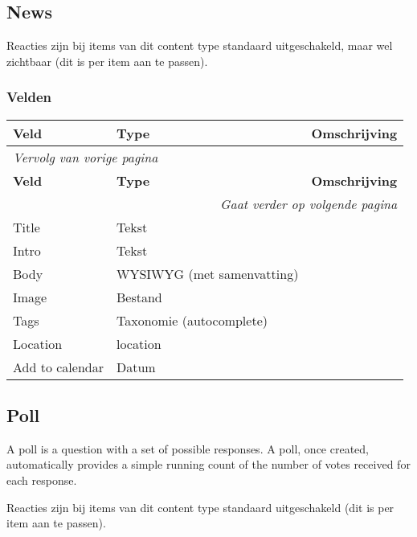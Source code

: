 \subsection{News}
\label{sec:content-news}
Reacties zijn bij items van dit content type standaard uitgeschakeld, maar wel zichtbaar (dit is per item aan te passen).

\subsubsection{Velden}
  \begin{longtable}{| p{3.75cm}|p{3.75cm}|p{7.50cm}|}
  \hline
  \rowcolor{tableheader}
  \textbf{Veld} & \textbf{Type} & \textbf{Omschrijving}  \tabularnewline
  \hline
\endfirsthead
\multicolumn{3}{l}{\textit{Vervolg van vorige pagina}} \\
\hline
\rowcolor{tableheader}
  \textbf{Veld} & \textbf{Type} & \textbf{Omschrijving}  \tabularnewline
  \hline
\hline
\endhead
\multicolumn{3}{r}{\textit{Gaat verder op volgende pagina}} \\
\endfoot
\hline
\endlastfoot
  \raggedright{Title} & \raggedright{Tekst} & \raggedright{}  \tabularnewline
  \hline
  \raggedright{Intro} & \raggedright{Tekst} & \raggedright{}  \tabularnewline
  \hline
  \raggedright{Body} & \raggedright{WYSIWYG (met samenvatting)} & \raggedright{}  \tabularnewline
  \hline
  \raggedright{Image} & \raggedright{Bestand} & \raggedright{}  \tabularnewline
  \hline
  \raggedright{Tags} & \raggedright{Taxonomie (autocomplete)} & \raggedright{}  \tabularnewline
  \hline
  \raggedright{Location} & \raggedright{location} & \raggedright{}  \tabularnewline
  \hline
  \raggedright{Add to calendar} & \raggedright{Datum} & \raggedright{}  \tabularnewline
  \hline
  \end{longtable}

\subsection{Poll}
\label{sec:content-poll}
A poll is a question with a set of possible responses. A poll, once created, automatically provides a simple running count of the number of votes received for each response.

Reacties zijn bij items van dit content type standaard uitgeschakeld (dit is per item aan te passen).


